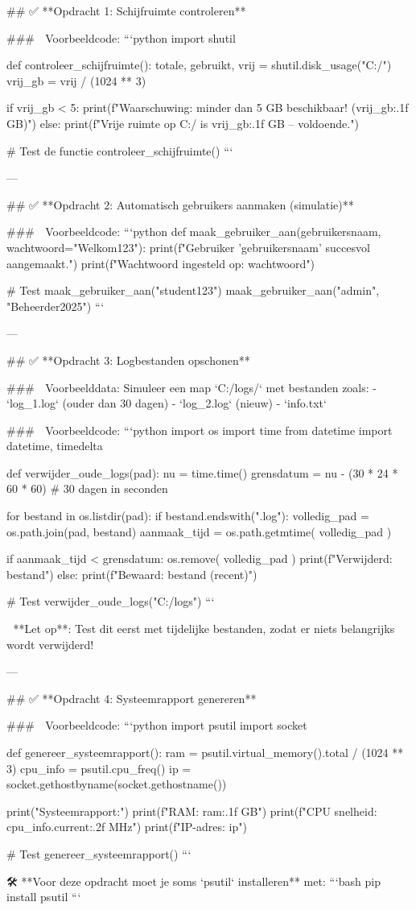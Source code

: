 ## ✅ **Opdracht 1: Schijfruimte controleren**

### 🧪 Voorbeeldcode:
```python
import shutil

def controleer_schijfruimte():
    totale, gebruikt, vrij = shutil.disk_usage("C:/")
    vrij_gb = vrij / (1024 ** 3)

    if vrij_gb < 5:
        print(f"Waarschuwing: minder dan 5 GB beschikbaar! ({vrij_gb:.1f} GB)")
    else:
        print(f"Vrije ruimte op C:/ is {vrij_gb:.1f} GB – voldoende.")
        
# Test de functie
controleer_schijfruimte()
```

---

## ✅ **Opdracht 2: Automatisch gebruikers aanmaken (simulatie)**

### 🧪 Voorbeeldcode:
```python
def maak_gebruiker_aan(gebruikersnaam, wachtwoord="Welkom123"):
    print(f"Gebruiker '{gebruikersnaam}' succesvol aangemaakt.")
    print(f"Wachtwoord ingesteld op: {wachtwoord}")

# Test
maak_gebruiker_aan("student123")
maak_gebruiker_aan("admin", "Beheerder2025")
```

---

## ✅ **Opdracht 3: Logbestanden opschonen**

### 📁 Voorbeelddata:
Simuleer een map `C:/logs/` met bestanden zoals:
- `log_1.log` (ouder dan 30 dagen)
- `log_2.log` (nieuw)
- `info.txt`

### 🧪 Voorbeeldcode:
```python
import os
import time
from datetime import datetime, timedelta

def verwijder_oude_logs(pad):
    nu = time.time()
    grensdatum = nu - (30 * 24 * 60 * 60)  # 30 dagen in seconden

    for bestand in os.listdir(pad):
        if bestand.endswith(".log"):
            volledig_pad = os.path.join(pad, bestand)
            aanmaak_tijd = os.path.getmtime( volledig_pad )

            if aanmaak_tijd < grensdatum:
                os.remove( volledig_pad )
                print(f"Verwijderd: {bestand}")
            else:
                print(f"Bewaard: {bestand} (recent)")

# Test
verwijder_oude_logs("C:/logs")
```

📌 **Let op**: Test dit eerst met tijdelijke bestanden, zodat er niets belangrijks wordt verwijderd!

---

## ✅ **Opdracht 4: Systeemrapport genereren**

### 🧪 Voorbeeldcode:
```python
import psutil
import socket

def genereer_systeemrapport():
    ram = psutil.virtual_memory().total / (1024 ** 3)
    cpu_info = psutil.cpu_freq()
    ip = socket.gethostbyname(socket.gethostname())

    print("Systeemrapport:")
    print(f"RAM: {ram:.1f} GB")
    print(f"CPU snelheid: {cpu_info.current:.2f} MHz")
    print(f"IP-adres: {ip}")

# Test
genereer_systeemrapport()
```

🛠️ **Voor deze opdracht moet je soms `psutil` installeren** met:
```bash
pip install psutil
```

